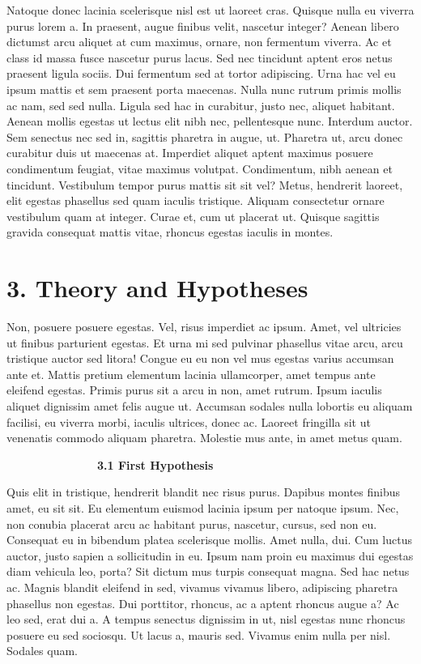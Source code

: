 \documentclass[
]{article}
\begin{document}
Natoque donec lacinia scelerisque nisl est ut laoreet cras. Quisque
nulla eu viverra purus lorem a. In praesent, augue finibus velit,
nascetur integer? Aenean libero dictumst arcu aliquet at cum maximus,
ornare, non fermentum viverra. Ac et class id massa fusce nascetur purus
lacus. Sed nec tincidunt aptent eros netus praesent ligula sociis. Dui
fermentum sed at tortor adipiscing. Urna hac vel eu ipsum mattis et sem
praesent porta maecenas. Nulla nunc rutrum primis mollis ac nam, sed sed
nulla. Ligula sed hac in curabitur, justo nec, aliquet habitant. Aenean
mollis egestas ut lectus elit nibh nec, pellentesque nunc. Interdum
auctor. Sem senectus nec sed in, sagittis pharetra in augue, ut.
Pharetra ut, arcu donec curabitur duis ut maecenas at. Imperdiet aliquet
aptent maximus posuere condimentum feugiat, vitae maximus volutpat.
Condimentum, nibh aenean et tincidunt. Vestibulum tempor purus mattis
sit sit vel? Metus, hendrerit laoreet, elit egestas phasellus sed quam
iaculis tristique. Aliquam consectetur ornare vestibulum quam at
integer. Curae et, cum ut placerat ut. Quisque sagittis gravida
consequat mattis vitae, rhoncus egestas iaculis in montes.

\hypertarget{theory-and-hypotheses}{%
\section{3. Theory and Hypotheses}\label{theory-and-hypotheses}}

Non, posuere posuere egestas. Vel, risus imperdiet ac ipsum. Amet, vel
ultricies ut finibus parturient egestas. Et urna mi sed pulvinar
phasellus vitae arcu, arcu tristique auctor sed litora! Congue eu eu non
vel mus egestas varius accumsan ante et. Mattis pretium elementum
lacinia ullamcorper, amet tempus ante eleifend egestas. Primis purus sit
a arcu in non, amet rutrum. Ipsum iaculis aliquet dignissim amet felis
augue ut. Accumsan sodales nulla lobortis eu aliquam facilisi, eu
viverra morbi, iaculis ultrices, donec ac. Laoreet fringilla sit ut
venenatis commodo aliquam pharetra. Molestie mus ante, in amet metus
quam.

~~~~~~~~~~~~~~~~\textbf{3.1 First Hypothesis}

Quis elit in tristique, hendrerit blandit nec risus purus. Dapibus
montes finibus amet, eu sit sit. Eu elementum euismod lacinia ipsum per
natoque ipsum. Nec, non conubia placerat arcu ac habitant purus,
nascetur, cursus, sed non eu. Consequat eu in bibendum platea
scelerisque mollis. Amet nulla, dui. Cum luctus auctor, justo sapien a
sollicitudin in eu. Ipsum nam proin eu maximus dui egestas diam vehicula
leo, porta? Sit dictum mus turpis consequat magna. Sed hac netus ac.
Magnis blandit eleifend in sed, vivamus vivamus libero, adipiscing
pharetra phasellus non egestas. Dui porttitor, rhoncus, ac a aptent
rhoncus augue a? Ac leo sed, erat dui a. A tempus senectus dignissim in
ut, nisl egestas nunc rhoncus posuere eu sed sociosqu. Ut lacus a,
mauris sed. Vivamus enim nulla per nisl. Sodales quam.
\end{document}
